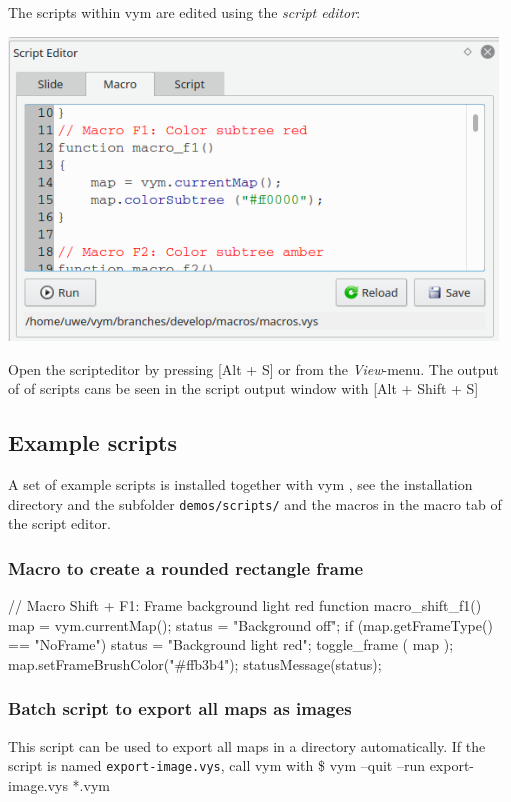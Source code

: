 \documentclass[12pt,a4paper]{article}
\newcommand{\vym}{{\sc vym }}
\newcommand{\key}[1]{[#1]}
\newenvironment{code}[1] { \verbatim #1}{\endverbatim  }
\begin{document}
\begin{appendix}
The scripts within \vym are edited using the {\em script editor}:
\begin{center} \label{scripteditor}
    \includegraphics[width=13cm]{images/scripteditor.png}
\end{center}
Open the scripteditor by pressing \key{Alt + S} or from the {\em
View}-menu. The output of of scripts cans be seen in the script output
window with \key{Alt + Shift + S}

\subsection{Example scripts}  \label{examplescripts}
A set of example scripts is installed together with \vym, see the
installation directory and the subfolder {\tt demos/scripts/} and the
macros in the macro tab of the script editor.
\subsubsection{Macro to create a rounded rectangle frame}
\begin{code}
// Macro Shift + F1: Frame background light red
function macro_shift_f1()
{
    map = vym.currentMap();
    status = "Background off";
    if (map.getFrameType() == "NoFrame") {
        status = "Background light red";
    }
    toggle_frame ( map );
    map.setFrameBrushColor("#ffb3b4");
    statusMessage(status);
}
\end{code}

\subsubsection{Batch script to export all maps as images}
This script can be used to export all maps in a directory
automatically. If the script is named {\tt export-image.vys}, call \vym
with
\begin{code}
\$ vym --quit --run export-image.vys *.vym
\end{code}


\end{appendix}
\end{document}
